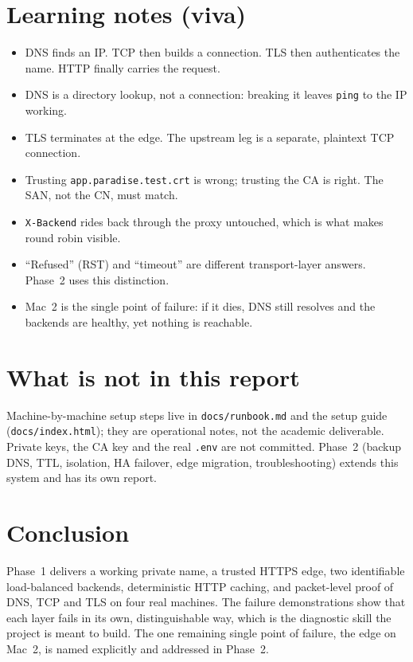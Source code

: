 \documentclass[11pt,a4paper]{article}
\begin{document}
\section{Learning notes (viva)}
\begin{itemize}
  \item DNS finds an IP. TCP then builds a connection. TLS then authenticates the name. HTTP finally carries the request.
  \item DNS is a directory lookup, not a connection: breaking it leaves \texttt{ping} to the IP working.
  \item TLS terminates at the edge. The upstream leg is a separate, plaintext TCP connection.
  \item Trusting \texttt{app.paradise.test.crt} is wrong; trusting the CA is right. The SAN, not the CN, must match.
  \item \texttt{X-Backend} rides back through the proxy untouched, which is what makes round robin visible.
  \item ``Refused'' (RST) and ``timeout'' are different transport-layer answers. Phase~2 uses this distinction.
  \item Mac~2 is the single point of failure: if it dies, DNS still resolves and the backends are healthy, yet nothing is reachable.
\end{itemize}

\section{What is not in this report}
Machine-by-machine setup steps live in \texttt{docs/runbook.md} and the setup guide
(\texttt{docs/index.html}); they are operational notes, not the academic deliverable. Private
keys, the CA key and the real \texttt{.env} are not committed. Phase~2 (backup DNS, TTL, isolation,
HA failover, edge migration, troubleshooting) extends this system and has its own report.

\section{Conclusion}
Phase~1 delivers a working private name, a trusted HTTPS edge, two identifiable load-balanced
backends, deterministic HTTP caching, and packet-level proof of DNS, TCP and TLS on four
real machines. The failure demonstrations show that each layer fails in its own, distinguishable
way, which is the diagnostic skill the project is meant to build. The one remaining single point
of failure, the edge on Mac~2, is named explicitly and addressed in Phase~2.
\end{document}

